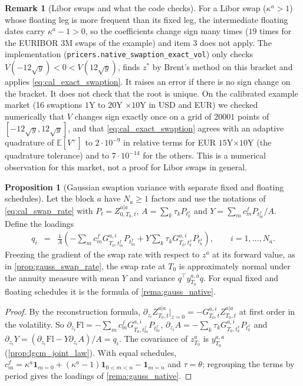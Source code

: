 \documentclass[11pt,english]{amsart}
\newcommand{\vun}{\mathbf{1}}
\newcommand{\Fl}{\mathrm{Fl}}
\newcommand{\EE}{\mathbb{E}}
\theoremstyle{definition}
\newtheorem{prop}{Proposition}
\newtheorem{rema}{Remark}
\begin{document}
\begin{rema}[Libor swaps and what the code checks]
For a Libor swap ($\kappa^a>1$) whose floating leg is more frequent than its fixed leg, the intermediate floating dates carry $\kappa^a-1>0$, so the coefficients change sign many times ($19$ times for the EURIBOR 3M swaps of the example) and item 3 does not apply. The implementation (\texttt{pricers.native\_swaption\_exact\_vol}) only checks $V(-12\sqrt{y})<0<V(12\sqrt{y})$, finds $z^*$ by Brent's method on this bracket and applies \eqref{eq:cal_exact_swaption}. It raises an error if there is no sign change on the bracket. It does not check that the root is unique. On the calibrated example market (16 swaptions $1$Y to $20$Y $\times 10$Y in USD and EUR) we checked numerically that $V$ changes sign exactly once on a grid of $20001$ points of $[-12\sqrt{y},12\sqrt{y}]$, and that \eqref{eq:cal_exact_swaption} agrees with an adaptive quadrature of $\EE[V^+]$ to $2\cdot10^{-9}$ in relative terms for EUR $15$Y$\times10$Y (the quadrature tolerance) and to $7\cdot10^{-14}$ for the others. This is a numerical observation for this market, not a proof for Libor swaps in general.
\end{rema}

\begin{prop}[Gaussian swaption variance with separate fixed and floating schedules]\label{prop:cal_gauss_swaption}
Let the block $a$ have $N_a\ge 1$ factors and use the notations of \eqref{eq:cal_swap_rate} with $P_t = Z^{a|a}_{0,T_0,t}$, $A = \sum_k\tau_kP_{t^x_k}$ and $Y = \sum_m c^f_mP_{t^f_m}/A$. Define the loadings
\begin{eqnarray}
  q_i &=& \frac{1}{A}\left( -\sum_m c^f_m G^{a,i}_{T_0,t^f_m} P_{t^f_m} + Y \sum_k \tau_k G^{a,i}_{T_0,t^x_k} P_{t^x_k} \right) , \qquad i = 1,\ldots,N_a .
\end{eqnarray}
Freezing the gradient of the swap rate with respect to $z^a$ at its forward value, as in \autoref{prop:gauss_swap_rate}, the swap rate at $T_0$ is approximately normal under the annuity measure with mean $Y$ and variance $q^\top y^{a,a}_{T_0}q$. For equal fixed and floating schedules it is the formula of \autoref{rema:gauss_native}.
\end{prop}

\begin{proof}
By the reconstruction formula, $\partial_{z_i}Z^{a|a}_{T_0,t}|_{z=0} = -G^{a,i}_{T_0,t}Z^{a|a}_{T_0,t}$ at first order in the volatility. So $\partial_{z_i}\Fl = -\sum_mc^f_mG^{a,i}_{T_0,t^f_m}P_{t^f_m}$, $\partial_{z_i}A = -\sum_k\tau_kG^{a,i}_{T_0,t^x_k}P_{t^x_k}$ and $\partial_{z_i}Y = (\partial_{z_i}\Fl - Y\partial_{z_i}A)/A = q_i$. The covariance of $z^a_{T_0}$ is $y^{a,a}_{T_0}$ (\autoref{prop:lgcm_joint_law}). With equal schedules, $c^f_m = \kappa^a\vun_{m=0} + (\kappa^a-1)\vun_{0<m<n} - \vun_{m=n}$ and $\tau = \theta$; regrouping the terms by period gives the loadings of \autoref{rema:gauss_native}.
\end{proof}
\end{document}
